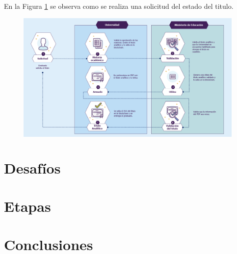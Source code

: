 \documentclass[11pt,a4paper]{article}
\begin{document}
        En la Figura \ref{fig:cuadro_problematica} se observa como se realiza una solicitud 
        del estado del titulo.
        
        \begin{figure}
            \centering
            \includegraphics[width=\textwidth]{Img/cuadro_problematica.png}
            \caption{}
            \label{fig:cuadro_problematica}
        \end{figure}



    \section{Desafíos}

    \section{Etapas}

    \section{Conclusiones}
\end{document}
